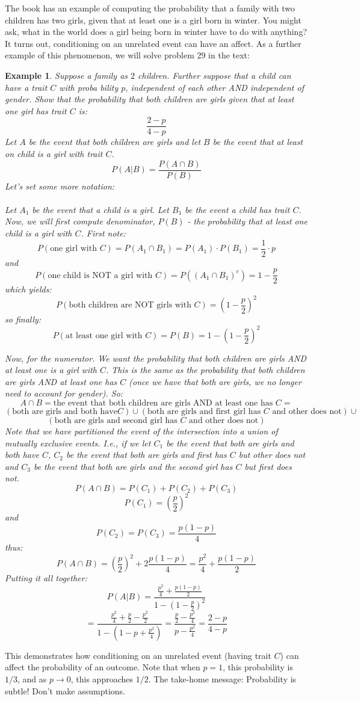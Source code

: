 \documentclass[12pt]{article} %
\newtheorem{example}{Example}
\begin{document}
The book has an example of computing the probability that a family with two children has two girls, given that at least one is a girl born in winter. You might ask, what in the world does a girl being born in winter have to do with anything? It turns out, conditioning on an unrelated event can have an affect. As a further example of this phenomenon, we will solve problem 29 in the text:
\begin{example}
Suppose a family as $2$ children. Further suppose that a child can have a trait $C$ with proba bility $p$, independent of each other AND independent of gender. Show that the probability that both children are girls given that at least one girl has trait $C$ is:
$$\frac{2-p}{4-p}$$
Let $A$ be the event that both children are girls and let $B$ be the event that at least on child is a girl with trait $C$.
$$P(A|B)=\frac{P(A\cap B)}{P(B)}$$
Let's set some more notation:\\\\
Let $A_1$ be the event that a child is a girl. Let $B_1$ be the event a child has trait $C$. Now, we will first compute denominator, $P(B)$ - the probability that at least one child is a girl with $C$. First note:
$$P(\textrm{one girl with }C) = P(A_1\cap B_1) = P(A_1)\cdot P(B_1) = \frac12\cdot p$$
and
$$P(\textrm{one child is NOT a girl with }C) = P((A_1\cap B_1)^c) = 1-\frac{p}2$$
which yields:
$$P(\textrm{both children are NOT girls with }C) = \left(1-\frac{p}2\right)^2$$
so finally:
$$P(\textrm{at least one girl with }C)= P(B) = 1-\left(1-\frac{p}2\right)^2$$

Now, for the numerator. We want the probability that both children are girls AND at least one is a girl with $C$. This is the same as the probability that both children are girls AND at least one has $C$ (once we have that both are girls, we no longer need to account for gender). So:
$$A\cap B = \textrm{the event that both children are girls AND at least one has }C = $$
$$(\textrm{both are girls and both have} C)\cup(\textrm{both are girls and first girl has }C \textrm{ and other does not})\cup$$
$$ (\textrm{both are girls and second girl has }C\textrm{ and other does not})$$
Note that we have \emph{partitioned} the event of the intersection into a union of mutually exclusive events. I.e., if we let $C_1$ be the event that both are girls and both have $C$, $C_2$ be the event that both are girls and first has $C$ but other does not and $C_3$ be the event that both are girls and the second girl has $C$ but first does not.
$$P(A\cap B) = P(C_1)+P(C_2)+P(C_3)$$
$$P(C_1) = \left(\frac{p}2\right)^2$$
and
$$P(C_2)=P(C_3) = \frac{p(1-p)}{4}$$
thus:
$$P(A\cap B) = \left(\frac{p}2\right)^2 + 2 \frac{p(1-p)}{4} = \frac{p^2}{4}+\frac{p(1-p)}2$$
Putting it all together:
$$P(A|B) = \frac{\frac{p^2}{4}+\frac{p(1-p)}2}{1-\left(1-\frac{p}2\right)^2}$$
$$= \frac{\frac{p^2}4+\frac{p}2-\frac{p^2}2}{1-\left(1-p+\frac{p^2}4\right)} = \frac{\frac{p}2-\frac{p^2}4}{p-\frac{p^2}4} = \frac{2-p}{4-p}$$
\end{example}
This demonstrates how conditioning on an unrelated event (having trait $C$) can affect the probability of an outcome. Note that when $p=1$, this probability is $1/3$, and as $p\rightarrow0$, this approaches $1/2$. The take-home message: Probability is subtle! Don't make assumptions. 
\end{document}
